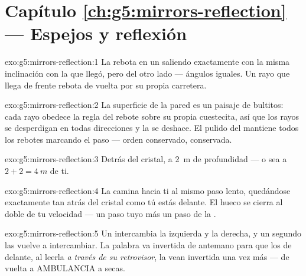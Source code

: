 \section*{Capítulo \ref{ch:g5:mirrors-reflection} --- Espejos y reflexión}

\begin{solution}{exo:g5:mirrors-reflection:1}
La  rebota en un  saliendo exactamente con la misma
inclinación con la que llegó, pero del otro lado --- ángulos iguales.
Un rayo que llega de frente rebota de vuelta por su propia carretera.
\end{solution}

\begin{solution}{exo:g5:mirrors-reflection:2}
La superficie de la pared es un paisaje de bultitos: cada rayo obedece
la regla del rebote sobre su propia cuestecita, así que los rayos se
desperdigan en todas direcciones y la  se deshace. El pulido del
 mantiene todos los rebotes marcando el paso --- orden
conservado,  conservada.
\end{solution}

\begin{solution}{exo:g5:mirrors-reflection:3}
Detrás del cristal, a \qty{2}{m} de profundidad --- o sea a
$2 + 2 = \qty{4}{m}$ de ti.
\end{solution}

\begin{solution}{exo:g5:mirrors-reflection:4}
La  camina hacia ti al mismo paso lento, quedándose
exactamente tan atrás del cristal como tú estás delante. El hueco se
cierra al doble de tu velocidad --- un paso tuyo más un paso de la
.
\end{solution}

\begin{solution}{exo:g5:mirrors-reflection:5}
Un  intercambia la izquierda y la derecha, y un segundo
 las vuelve a intercambiar. La palabra va invertida de
antemano para que los  de delante, al leerla \emph{a través
de su  retrovisor}, la vean invertida una vez más --- de
vuelta a AMBULANCIA a secas.
\end{solution}

